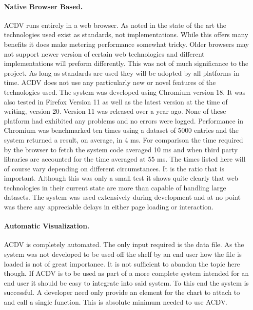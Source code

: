 \documentclass[a4paper, 11pt, titlepage, onehalfspacing]{report}
\begin{document}
\paragraph{Native Browser Based.}AC\lightning{}DV runs entirely in a web browser. As noted in the state of the art the technologies used exist as standards, not implementations. While this offers many benefits it does make metering performance somewhat tricky. Older browsers may not support newer version of certain web technologies and different implementations will preform differently. This was not of much significance to the project. As long as standards are used they will be adopted by all platforms in time. AC\lightning{}DV does not use any particularly new or novel features of the technologies used. The system was developed using Chromium version 18. It was also tested in Firefox Version 11 as well as the latest version at the time of writing, version 20. Version 11 was released over a year ago. None of these platform had exhibited any problems and no errors were logged. Performance in Chromium was benchmarked ten times using a dataset of 5000 entries and the system returned a result, on average, in 4 ms. For comparison the time required by the browser to fetch the system code averaged 10 ms and when third party libraries are accounted for the time averaged at 55 ms. The times listed here will of course vary depending on different circumstances. It is the ratio that is important. Although this was only a small test it shows quite clearly that web technologies in their current state are more than capable of handling large datasets. The system was used extensively during development and at no point was there any appreciable delays in either page loading or interaction.

\paragraph{Automatic Visualization.}AC\lightning{}DV is completely automated. The only input required is the data file. As the system was not developed to be used off the shelf by an end user how the file is loaded is not of great importance. It is not sufficient to abandon the topic here though. If AC\lightning{}DV is to be used as part of a more complete system intended for an end user it should be easy to integrate into said system. To this end the system is successful. A developer need only provide an element for the chart to attach to and call a single function. This is absolute minimum needed to use AC\lightning{}DV.
\end{document}
